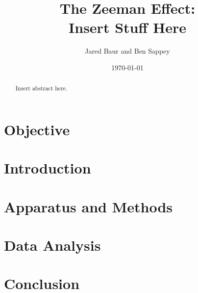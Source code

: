 \documentclass[%
 aip,
 amsmath,amssymb,
 reprint,%
floatfix,
]{revtex4-1}
\begin{document}

\title[]{The Zeeman Effect:\\ Insert Stuff Here}

\author{Jared Baur and Ben Sappey}

\date{\today}%


\begin{abstract}

	Insert abstract here.

\end{abstract}

\maketitle


\onecolumngrid

\section{\label{sec:level1}Objective}


\section{\label{sec:level2}Introduction}


\section{\label{sec:level3}Apparatus and Methods}


\section{\label{sec:level4}Data Analysis}


\section{\label{sec:level5}Conclusion}


\nocite{*}
\end{document}
